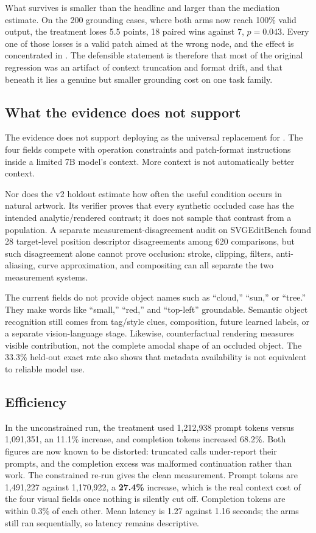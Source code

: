 \documentclass[10pt,a4paper]{article}
\newcommand{\code}[1]{\texttt{\detokenize{#1}}}
\begin{document}
What survives is smaller than the headline and larger than the mediation
estimate. On the 200 grounding cases, where both arms now reach 100\% valid
output, the treatment loses 5.5 points, 18 paired wins against 7,
\(p=0.043\). Every one of those losses is a valid patch aimed at the wrong
node, and the effect is concentrated in \code{change_color}. The defensible
statement is therefore that most of the original regression was an artifact
of context truncation and format drift, and that beneath it lies a genuine
but smaller grounding cost on one task family.

\subsection{What the evidence does not support}

The evidence does not support deploying \code{visual_stats_patch} as the
universal replacement for \code{skeleton_patch}. The four fields compete with
operation constraints and patch-format instructions inside a limited 7B
model's context. More context is not automatically better context.

Nor does the v2 holdout estimate how often the useful condition occurs in
natural artwork. Its verifier proves that every synthetic occluded case has
the intended analytic/rendered contrast; it does not sample that contrast from
a population. A separate measurement-disagreement audit on SVGEditBench found
28 target-level position descriptor disagreements among 620 comparisons, but
such disagreement alone cannot prove occlusion: stroke, clipping, filters,
anti-aliasing, curve approximation, and compositing can all separate the two
measurement systems.

The current fields do not provide object names such as ``cloud,'' ``sun,'' or
``tree.'' They make words like ``small,'' ``red,'' and ``top-left'' groundable.
Semantic object recognition still comes from tag/style clues, composition,
future learned labels, or a separate vision-language stage. Likewise,
counterfactual rendering measures visible contribution, not the complete
amodal shape of an occluded object. The 33.3\% held-out exact rate also shows
that metadata availability is not equivalent to reliable model use.

\subsection{Efficiency}

In the unconstrained run, the treatment used 1,212,938 prompt tokens versus
1,091,351, an 11.1\% increase, and completion tokens increased 68.2\%. Both
figures are now known to be distorted: truncated calls under-report their
prompts, and the completion excess was malformed continuation rather than
work. The constrained re-run gives the clean measurement. Prompt tokens are
1,491,227 against 1,170,922, a \textbf{27.4\%} increase, which is the real
context cost of the four visual fields once nothing is silently cut off.
Completion tokens are within 0.3\% of each other. Mean latency is 1.27 against
1.16 seconds; the arms still ran sequentially, so latency remains descriptive.
\end{document}
